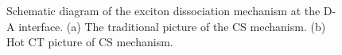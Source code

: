\documentclass[12pt]{article}
\begin{document}
\begin{figure}[H]
\centering
{} \hspace{5pt}
\caption{Schematic diagram of the exciton dissociation mechanism at the D-A interface. (a) The traditional picture of the CS mechanism. (b) Hot CT picture of CS mechanism.}
\label{fig:hot and cold mechanism}
\end{figure}
\end{document}
